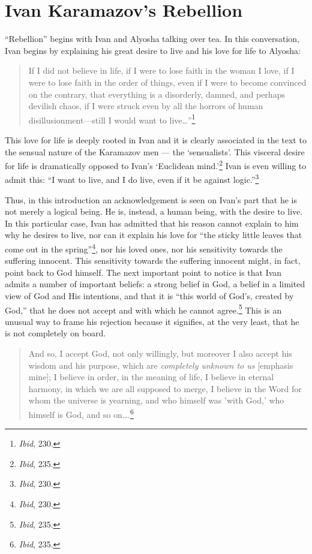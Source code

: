 \section{Ivan Karamazov's Rebellion}
``Rebellion'' begins with Ivan and Alyosha talking over tea. In this conversation, Ivan begins by explaining his great desire to live and his love for life to Alyosha:

\begin{quote}
\singlespacing
If I did not believe in life, if I were to lose faith in the woman I love, if I were to lose faith in the order of things, even if I were to become convinced on the contrary, that everything is a disorderly, damned, and perhaps devilish chaos, if I were struck even by all the horrors of human disillusionment---still I would want to live\ldots''\footnote{\emph{Ibid}, 230.}
\end{quote}

This love for life is deeply rooted in Ivan and it is clearly associated in the text to the sensual nature of the Karamazov men --- the `sensualists'. This visceral desire for life is dramatically opposed to Ivan's `Euclidean mind.'\footnote{\emph{Ibid}, 235.} Ivan is even willing to admit this: ``I want to live, and I do live, even if it be against logic.''\footnote{\emph{Ibid}, 230.} 

Thus, in this introduction an acknowledgement is seen on Ivan's part that he is not merely a logical being. He is, instead, a human being, with the desire to live. In this particular case, Ivan has admitted that his reason cannot explain to him why he desires to live, nor can it explain his love for ``the sticky little leaves that come out in the spring''\footnote{\emph{Ibid}, 230.}, nor his loved ones, nor his sensitivity towards the suffering innocent. This sensitivity towards the suffering innocent might, in fact, point back to God himself. The next important point to notice is that Ivan admits a number of important beliefs: a strong belief in God, a belief in a limited view of God and His intentions, and that it is ``this world of God's, created by God,'' that he does not accept and with which he cannot agree.\footnote{\emph{Ibid}, 235.} This is an unusual way to frame his rejection because it signifies, at the very least, that he is not completely on board.

\begin{quote}
\singlespacing
And so, I accept God, not only willingly, but moreover I also accept his wisdom and his purpose, which are \emph{completely unknown to us} [emphasis mine]; I believe in order, in the meaning of life, I believe in eternal harmony, in which we are all supposed to merge, I believe in the Word for whom the universe is yearning, and who himself was 'with God,' who himself is God, and so on\ldots.\footnote{\emph{Ibid}, 235.}
\end{quote} 

